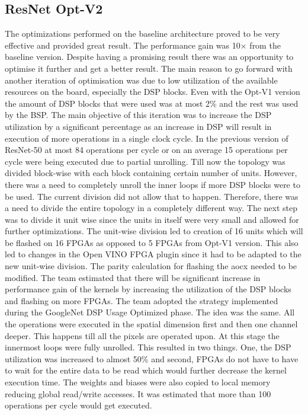 \subsection{ResNet Opt-V2}
The optimizations performed on the baseline architecture proved to be very effective and provided great result. The performance gain was 10$\times$ from the baseline version. Despite having a promising result there was an opportunity to optimise it further and get a better result. The main reason to go forward with another iteration of optimisation was due to low utilization of the available resources on the board, especially the DSP blocks. Even with the Opt-V1 version the amount of DSP blocks that were used was at most 2\% and the rest was used by the BSP. The main objective of this iteration was to increase the DSP utilization by a significant percentage as an increase in DSP will result in execution of more operations in a single clock cycle. In the previous version of ResNet-50 at most 84 operations per cycle or on an average 15 operations per cycle were being executed due to partial unrolling.
\newline
Till now the topology was divided block-wise with each block containing certain number of units. However, there was a need to completely unroll the inner loops if more DSP blocks were to be used. The current division did not allow that to happen. Therefore, there was a need to divide the entire topology in a completely different way. The next step was to divide it unit wise since the units in itself were very small and allowed for further optimizations. The unit-wise division led to creation of 16 units which will be flashed on 16 FPGAs as opposed to 5 FPGAs from Opt-V1 version. This also led to changes in the Open VINO FPGA plugin since it had to be adapted to the new unit-wise division. The parity calculation for flashing the aocx needed to be modified. The team estimated that there will be significant increase in performance gain of the kernels by increasing the utilization of the DSP blocks and flashing on more FPGAs. 
\newline
The team adopted the strategy implemented during the GoogleNet DSP Usage Optimized phase. The idea was the same. All the operations were executed in the spatial dimension first and then one channel deeper. This happens till all the pixels are operated upon. At this stage the innermost loops were fully unrolled. This resulted in two things. One, the DSP utilization was increased to almost 50\% and second, FPGAs do not have to have to wait for the entire data to be read which would further decrease the kernel execution time. The weights and biases were also copied to local memory reducing global read/write accesses. It was estimated that more than 100 operations per cycle would get executed. 
